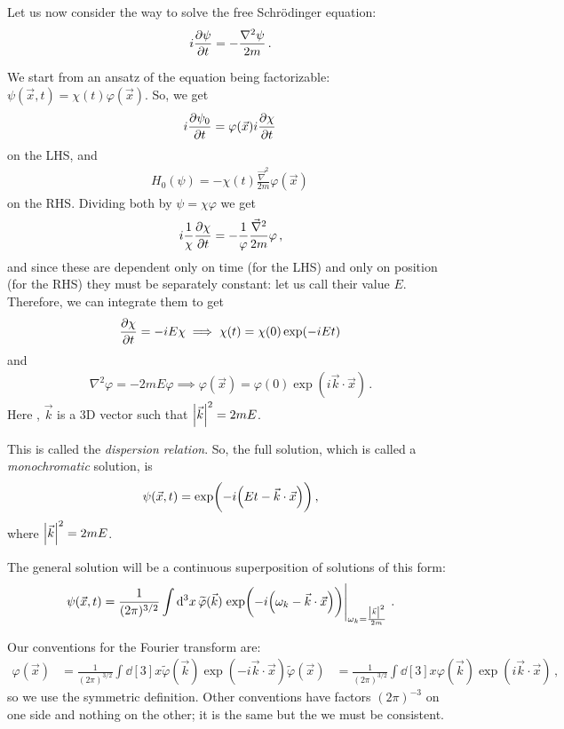 \documentclass[main.tex]{subfiles}
\begin{document}
Let us now consider the way to solve the free Schrödinger equation: 
%
\begin{align}
i \pdv{\psi }{t} = - \frac{\nabla^2 \psi }{2m } 
\,.
\end{align}

We start from an ansatz of the equation being factorizable: \(\psi (\vec{x}, t) = \chi (t) \varphi (\vec{x})\). So, we get 
%
\begin{align}
i \pdv{\psi_{0}}{t} = \varphi (\vec{x}) i \pdv{\chi }{t}
\,
\end{align}
%
on the LHS, and 
%
\begin{align}
H_0 (\psi ) = - \chi (t) \frac{\vec{\nabla}^2}{2m} \varphi (\vec{x})
\,
\end{align}
%
on the RHS. Dividing both by \(\psi = \chi \varphi \) we get 
%
\begin{align}
i \frac{1}{\chi } \pdv{\chi }{t} = - \frac{1}{\varphi } \frac{\vec{\nabla}^2}{2m} \varphi 
\,,
\end{align}
%
and since these are dependent only on time (for the LHS) and only on position (for the RHS) they must be separately constant: let us call their value \(E\). Therefore, we can integrate them to get 
%
\begin{align}
\pdv{\chi }{t} = - i E \chi  \implies \chi (t) = \chi (0) \exp(-iEt)
\,
\end{align}
%
and 
%
\begin{align}
\nabla^2 \varphi = -2 m E \varphi  \implies \varphi (\vec{x}) = \varphi (0) \exp(i \vec{k} \cdot \vec{x})
\,.
\end{align}
%
Here , \(\vec{k}\) is a 3D vector such that \(\abs{\vec{k}}^2 = 2 m E\). 

This is called the \emph{dispersion relation}. So, the full solution, which is called a \emph{monochromatic} solution, is 
%
\begin{align}
\psi (\vec{x}, t) = \exp(-i \qty(Et - \vec{k} \cdot \vec{x}))
\,,
\end{align}
%
where \(\abs{\vec{k}}^2 = 2mE\).

The general solution will be a continuous superposition of solutions of this form: 
%
\begin{align}
\psi (\vec{x}, t) = \frac{1}{(2\pi )^{3/2}} \int \dd[3]{x} \widetilde{\varphi} (\vec{k}) \eval{\exp(-i \qty(\omega_{k} - \vec{k} \cdot \vec{x}))}_{\omega_{k} = \frac{\abs{\vec{k}}^2}{2m}}
\,.
\end{align}

Our conventions for the Fourier transform are:
%
\begin{align}
\varphi (\vec{x}) &= \frac{1}{(2\pi )^{3/2}} \int \dd[3]{x} \widetilde{\varphi} (\vec{k}) \exp(-i \vec{k}\cdot \vec{x})
\widetilde{\varphi} (\vec{x}) &= \frac{1}{(2\pi )^{3/2}} \int \dd[3]{x} \varphi (\vec{k}) \exp(i \vec{k}\cdot \vec{x})
\,,
\end{align}
%
so we use the symmetric definition. Other conventions have factors \((2\pi )^{-3}\) on one side and nothing on the other; it is the same but the we must be consistent. 
\end{document}
